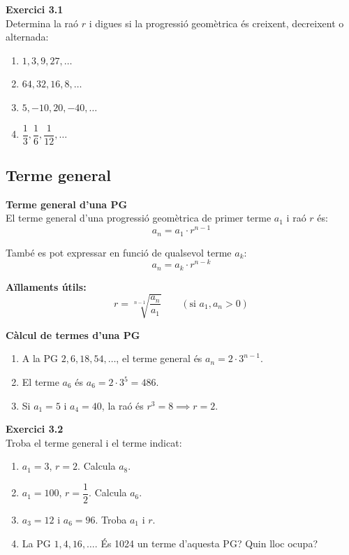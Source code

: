 \documentclass[12pt]{article}
\begin{document}
\begin{exercici}
\textbf{Exercici 3.1}\\
Determina la raó $r$ i digues si la progressió geomètrica és creixent, decreixent o alternada:
\begin{enumerate}[label=\alph*)]
    \item $1, 3, 9, 27, \dots$
    \item $64, 32, 16, 8, \dots$
    \item $5, -10, 20, -40, \dots$
    \item $\dfrac{1}{3}, \dfrac{1}{6}, \dfrac{1}{12}, \dots$
\end{enumerate}
\end{exercici}

\subsection{Terme general}

\begin{concept}
\textbf{Terme general d'una PG}\\
El terme general d'una progressió geomètrica de primer terme $a_1$ i raó $r$ és:
\[
\boxed{a_n = a_1 \cdot r^{n-1}}
\]

També es pot expressar en funció de qualsevol terme $a_k$:
\[
a_n = a_k \cdot r^{n-k}
\]

\textbf{Aïllaments útils:}
\[
r = \sqrt[n-1]{\dfrac{a_n}{a_1}} \qquad (\text{si } a_1, a_n > 0)
\]
\end{concept}

\begin{exemple}
\textbf{Càlcul de termes d'una PG}
\begin{enumerate}[label=\alph*)]
    \item A la PG $2, 6, 18, 54, \dots$, el terme general és $a_n = 2 \cdot 3^{n-1}$.
    \item El terme $a_6$ és $a_6 = 2 \cdot 3^5 = 486$.
    \item Si $a_1 = 5$ i $a_4 = 40$, la raó és $r^3 = 8 \implies r = 2$.
\end{enumerate}
\end{exemple}

\begin{exercici}
\textbf{Exercici 3.2}\\
Troba el terme general i el terme indicat:
\begin{enumerate}[label=\alph*)]
    \item $a_1 = 3$, $r = 2$. Calcula $a_8$.
    \item $a_1 = 100$, $r = \dfrac{1}{2}$. Calcula $a_6$.
    \item $a_3 = 12$ i $a_6 = 96$. Troba $a_1$ i $r$.
    \item La PG $1, 4, 16, \dots$. És 1024 un terme d'aquesta PG? Quin lloc ocupa?
\end{enumerate}
\end{exercici}
\end{document}
